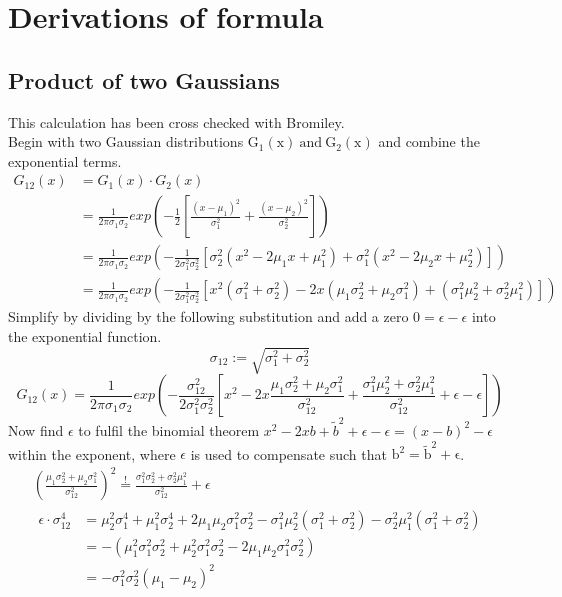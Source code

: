 \documentclass[twoside,openright]{scrreprt}
\begin{document}
\chapter{Derivations of formula}
\section{Product of two Gaussians}\label{GaussiansDerivation}
This calculation has been cross checked with Bromiley.\cite{Bromiley2014}\\
Begin with two Gaussian distributions $\mathrm{G_1(x)\ and \ G_2(x)}$ and combine the exponential terms.
\begin{equation*}
\begin{split}
G_{12}(x) & =  G_1(x) \cdot G_2(x) \\ 
& = \frac{1}{2\pi \sigma_1 \sigma_2}
exp\left(-\frac{1}{2}\left[\frac{\left(x-\mu_1\right)^2}{\sigma_1^2} + \frac{\left(x-\mu_2\right)^2}{\sigma_2^2} \right]\right)
\\
& = \frac{1}{2\pi \sigma_1 \sigma_2} exp \left(-\frac{1}{2\sigma_1^2 \sigma_2^2} \left[
\sigma_2^2 \left(x^2 - 2 \mu_1 x + \mu_1^2 \right) + 
\sigma_1^2 \left(x^2 - 2 \mu_2 x + \mu_2^2 \right)
\right] \right)
\\
& = \frac{1}{2\pi \sigma_1 \sigma_2} exp \left(-\frac{1}{2\sigma_1^2 \sigma_2^2} \left[
x^2(\sigma_1^2+\sigma_2^2) - 2x(\mu_1\sigma_2^2 + \mu_2\sigma_1^2) + (\sigma_1^2 \mu_2^2 + \sigma_2^2 \mu_1^2)
\right] \right)
\end{split}
\end{equation*}
Simplify by dividing by the following substitution and add a zero $0 = \epsilon - \epsilon$ into the exponential function.
\begin{equation*}
\sigma_{12} := \sqrt{\sigma_1^2+\sigma_2^2}
\end{equation*}
\begin{equation*}
G_{12}(x) = \frac{1}{2\pi \sigma_1 \sigma_2} exp \left(-\frac{\sigma_{12}^2}{2\sigma_1^2\sigma_2^2}\left[
x^2 - 2x\frac{\mu_1\sigma_2^2+ \mu_2\sigma_1^2}{\sigma_{12}^2} + \frac{\sigma_1^2\mu_2^2 + \sigma_2^2\mu_1^2}{\sigma_{12}^2}
+ \epsilon - \epsilon
\right]\right)
\end{equation*}
Now find $\epsilon$ to fulfil the binomial theorem $x^2- 2xb + \tilde{b}^2 + \epsilon - \epsilon= (x-b)^2 - \epsilon$ within the exponent, where $\epsilon$ is used to compensate such that $\mathrm{b^2 = \tilde{b}^2 + \epsilon}$.
\begin{gather*}
\left(\frac{\mu_1 \sigma_2^2 + \mu_2\sigma_1^2}{\sigma_{12}^2}\right)^2 \stackrel{!}{=} \frac{\sigma_1^2\sigma_2^2 + \sigma_2^2\mu_1^2}{\sigma_{12}^2} + \epsilon
\\
\begin{split}
\epsilon \cdot \sigma_{12}^4  & = \mu_2^2\sigma_1^4 + \mu_1^2\sigma_2^4 + 2\mu_1\mu_2\sigma_1^2\sigma_2^2 - \sigma_1^2\mu_2^2(\sigma_1^2+ \sigma_2^2) - \sigma_2^2\mu_1^2(\sigma_1^2+ \sigma_2^2)\\
& = - (\mu_1^2\sigma_1^2\sigma_2^2 + \mu_2^2\sigma_1^2\sigma_2^2 - 2 \mu_1\mu_2\sigma_1^2\sigma_2^2)\\
& = - \sigma_1^2\sigma_2^2(\mu_1-\mu_2)^2
\end{split}
\end{gather*}
\end{document}
